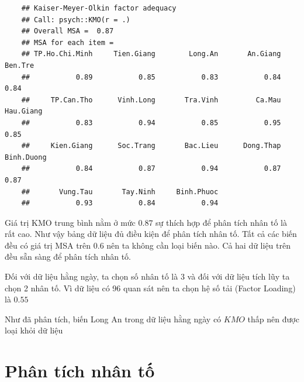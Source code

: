 \documentclass[../thesis.tex]{subfiles}
\begin{document}
\begin{verbatim}
	## Kaiser-Meyer-Olkin factor adequacy
	## Call: psych::KMO(r = .)
	## Overall MSA =  0.87
	## MSA for each item = 
	## TP.Ho.Chi.Minh     Tien.Giang        Long.An       An.Giang        Ben.Tre 
	##           0.89           0.85           0.83           0.84           0.84 
	##     TP.Can.Tho      Vinh.Long       Tra.Vinh         Ca.Mau      Hau.Giang 
	##           0.83           0.94           0.85           0.95           0.85 
	##     Kien.Giang      Soc.Trang       Bac.Lieu      Dong.Thap     Binh.Duong 
	##           0.84           0.87           0.94           0.87           0.87 
	##       Vung.Tau       Tay.Ninh     Binh.Phuoc 
	##           0.93           0.84           0.94
\end{verbatim}

Giá trị KMO trung bình nằm ở mức $ 0.87 $ sự thích hợp để phân tích nhân tố là rất cao. Như vậy bảng dữ liệu đủ điều kiện để phân tích nhân tố. Tất cả các biến đều có giá trị MSA trên $ 0.6 $ nên ta không cần loại biến nào. Cả hai dữ liệu trên đều sẵn sàng để phân tích nhân tố.

Đối với dữ liệu hằng ngày, ta chọn số nhân tố là 3 và đối với dữ liệu tích lũy ta chọn 2 nhân tố. Vì dữ liệu có 96 quan sát nên ta chọn hệ số tải (Factor Loading) là $ 0.55 $

Như đã phân tích, biến Long An trong dữ liệu hằng ngày có $ KMO $ thấp nên được loại khỏi dữ liệu 







\newpage

\section{Phân tích nhân tố}

\begin{Shaded}
	\begin{Highlighting}[]
\SpecialCharTok{\%\textgreater{}\%} \NormalTok{(}\SpecialCharTok{{-}}
		 
		 \NormalTok{) }\SpecialCharTok{\%\textgreater{}\%} 
		 \NormalTok{, }
		 \NormalTok{)}
	\end{Highlighting}
\end{Shaded}
\end{document}
